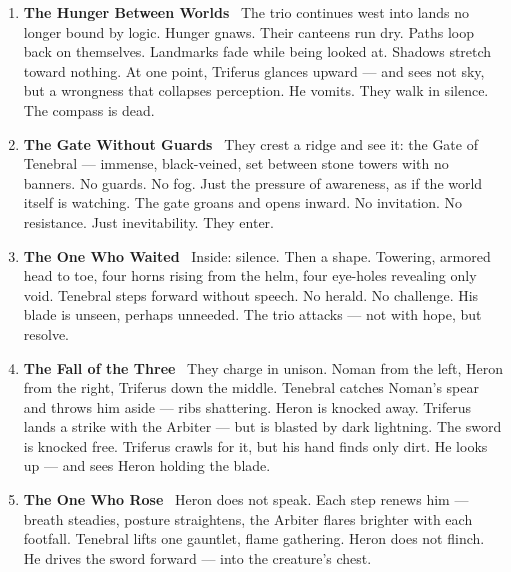 \documentclass[9pt]{article}
\begin{document}
\begin{center}
\begin{enumerate}

\item \textbf{The Hunger Between Worlds} \
The trio continues west into lands no longer bound by logic. Hunger gnaws. Their canteens run dry. Paths loop back on themselves. Landmarks fade while being looked at. Shadows stretch toward nothing. At one point, Triferus glances upward — and sees not sky, but a wrongness that collapses perception. He vomits. They walk in silence. The compass is dead.

\vspace{.3in}

\item \textbf{The Gate Without Guards} \
They crest a ridge and see it: the Gate of Tenebral — immense, black-veined, set between stone towers with no banners. No guards. No fog. Just the pressure of awareness, as if the world itself is watching. The gate groans and opens inward. No invitation. No resistance. Just inevitability. They enter.

\vspace{.3in}

\item \textbf{The One Who Waited} \
Inside: silence. Then a shape. Towering, armored head to toe, four horns rising from the helm, four eye-holes revealing only void. Tenebral steps forward without speech. No herald. No challenge. His blade is unseen, perhaps unneeded. The trio attacks — not with hope, but resolve.

\vspace{.3in}

\item \textbf{The Fall of the Three} \
They charge in unison. Noman from the left, Heron from the right, Triferus down the middle. Tenebral catches Noman’s spear and throws him aside — ribs shattering. Heron is knocked away. Triferus lands a strike with the Arbiter — but is blasted by dark lightning. The sword is knocked free. Triferus crawls for it, but his hand finds only dirt. He looks up — and sees Heron holding the blade.

\vspace{.3in}

\item \textbf{The One Who Rose} \
Heron does not speak. Each step renews him — breath steadies, posture straightens, the Arbiter flares brighter with each footfall. Tenebral lifts one gauntlet, flame gathering. Heron does not flinch. He drives the sword forward — into the creature’s chest.


\end{enumerate}
\end{center}
\end{document}
